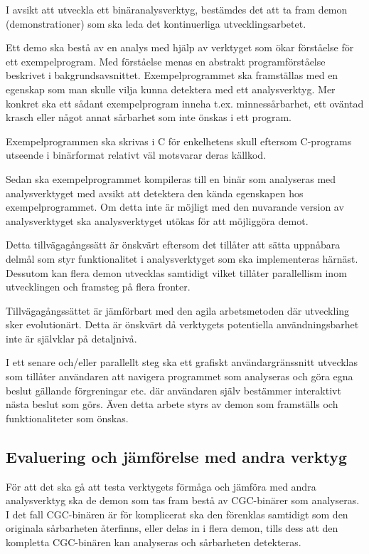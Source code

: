 
I avsikt att utveckla ett binäranalysverktyg, bestämdes det att ta fram demon
(demonstrationer) som ska leda det kontinuerliga utvecklingsarbetet.

Ett demo ska bestå av en analys med hjälp av verktyget som ökar förståelse för
ett exempelprogram. Med förståelse menas en abstrakt programförståelse
beskrivet i bakgrundsavsnittet. Exempelprogrammet ska framställas med en
egenskap som man skulle vilja kunna detektera med ett analysverktyg. Mer
konkret ska ett sådant exempelprogram inneha t.ex. minnessårbarhet, ett oväntad
krasch eller något annat sårbarhet som inte önskas i ett program.

Exempelprogrammen ska skrivas i C för enkelhetens skull eftersom C-programs
utseende i binärformat relativt väl motsvarar deras källkod. 

Sedan ska exempelprogrammet kompileras till en binär som analyseras med
analysverktyget med avsikt att detektera den kända egenskapen hos
exempelprogrammet. Om detta inte är möjligt med den nuvarande version av
analysverktyget ska analysverktyget utökas för att möjliggöra demot.

Detta tillvägagångssätt är önskvärt eftersom det tillåter att sätta uppnåbara
delmål som styr funktionalitet i analysverktyget som ska implementeras härnäst.
Dessutom kan flera demon utvecklas samtidigt vilket tillåter parallellism inom
utvecklingen och framsteg på flera fronter.

Tillvägagångssättet är jämförbart med den agila arbetsmetoden där utveckling sker 
evolutionärt. Detta är önskvärt då verktygets potentiella 
användningsbarhet inte är självklar på detaljnivå.

I ett senare och/eller parallellt steg ska ett grafiskt användargränssnitt
utvecklas som tillåter användaren att navigera programmet som analyseras och
göra egna beslut gällande förgreningar etc. där användaren själv bestämmer
interaktivt nästa beslut som görs. Även detta arbete styrs av demon som
framställs och funktionaliteter som önskas.

\subsection{Evaluering och jämförelse med andra verktyg}

För att det ska gå att testa verktygets förmåga och jämföra med andra
analysverktyg ska de demon som tas fram bestå av CGC-binärer som analyseras. I
det fall CGC-binären är för komplicerat ska den förenklas samtidigt som den
originala sårbarheten återfinns, eller delas in i flera demon, tills dess att
den kompletta CGC-binären kan analyseras och sårbarheten detekteras.

